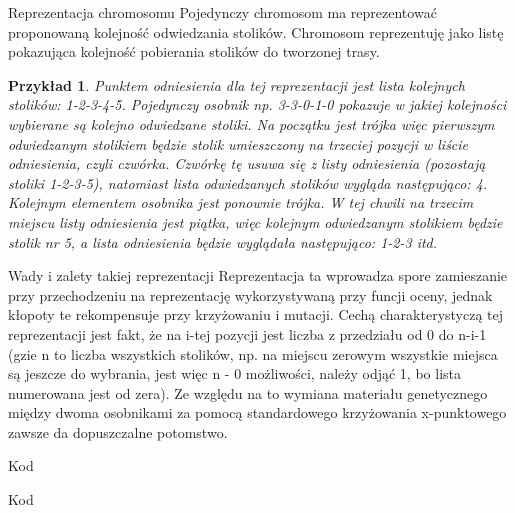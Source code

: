 \documentclass[a4paper,10pt]{beamer}
\newtheorem{przyk}{Przykład}[subsection]
\begin{document}
		\begin{frame}{Reprezentacja chromosomu}
			Pojedynczy chromosom ma reprezentować proponowaną kolejność odwiedzania stolików. Chromosom reprezentuję jako listę pokazująca kolejność pobierania stolików do tworzonej trasy.
			
			\begin{przyk}
					Punktem odniesienia dla tej reprezentacji jest lista kolejnych stolików: 1-2-3-4-5. Pojedynczy osobnik np. 3-3-0-1-0 pokazuje w jakiej kolejności wybierane są kolejno odwiedzane stoliki. Na początku jest trójka więc pierwszym odwiedzanym stolikiem będzie stolik umieszczony na trzeciej pozycji w liście odniesienia, czyli czwórka. Czwórkę tę usuwa się z listy odniesienia (pozostają stoliki 1-2-3-5), natomiast lista odwiedzanych stolików wygląda następująco: 4.
					Kolejnym elementem osobnika jest ponownie trójka. W tej chwili na trzecim miejscu listy odniesienia jest piątka, więc kolejnym odwiedzanym stolikiem będzie stolik nr 5, a lista odniesienia będzie wyglądała następująco: 1-2-3 itd.
			\end{przyk}
		\end{frame}
		\begin{frame}{Wady i zalety takiej reprezentacji}
			Reprezentacja ta wprowadza spore zamieszanie przy przechodzeniu na reprezentację wykorzystywaną przy funcji oceny, jednak kłopoty te rekompensuje przy krzyżowaniu i mutacji. Cechą charakterystyczą tej reprezentacji jest fakt, że na i-tej pozycji jest liczba z przedziału od 0 do n-i-1 (gzie n to liczba wszystkich stolików, np. na miejscu zerowym wszystkie miejsca są jeszcze do wybrania, jest więc n - 0 możliwości, należy odjąć 1, bo lista numerowana jest od zera). Ze względu na to wymiana materiału genetycznego między dwoma osobnikami za pomocą standardowego krzyżowania x-punktowego zawsze da dopuszczalne potomstwo.
		\end{frame}
		\begin{frame}{Kod}
		\end{frame}
		\begin{frame}{Kod}
		\end{frame}
	
\end{document}
